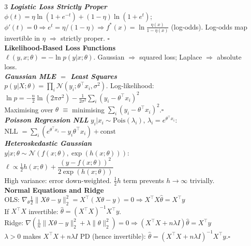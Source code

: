 \documentclass[a4paper,7pt]{article}
\begin{document}
\begin{multicols*}{3}
\textit{\textbf{Logistic Loss Strictly Proper}}\\
$\phi(t)=\eta\ln(1+e^{-t})+(1-\eta)\ln(1+e^t)$; $\phi'(t)=0\Rightarrow e^t=\eta/(1-\eta)\Rightarrow f^*(x)=\ln\frac{\eta(x)}{1-\eta(x)}$ (log-odds). Log-odds map invertible in $\eta$ $\Rightarrow$ strictly proper. \hfill$\square$\\

\textbf{Likelihood-Based Loss Functions}\\
$\ell(y,x;\theta)=-\ln p(y|x;\theta)$. Gaussian $\Rightarrow$ squared loss; Laplace $\Rightarrow$ absolute loss.\\

\textit{\textbf{Gaussian MLE $=$ Least Squares}}\\
$p(y|X;\theta)=\prod_i\mathcal{N}(y_i;\theta^\top x_i,\sigma^2)$. Log-likelihood:\\
$\ln p=-\frac{n}{2}\ln(2\pi\sigma^2)-\frac{1}{2\sigma^2}\sum_i(y_i-\theta^\top x_i)^2$\\
Maximising over $\theta$ $\equiv$ minimising $\sum_i(y_i-\theta^\top x_i)^2$.\hfill$\square$\\

\textit{\textbf{Poisson Regression NLL}} $y_i|x_i\sim\mathrm{Pois}(\lambda_i)$, $\lambda_i=e^{\theta^\top x_i}$:\\
NLL $=\sum_i(e^{\theta^\top x_i}-y_i\theta^\top x_i)+\mathrm{const}$\\

\textit{\textbf{Heteroskedastic Gaussian}}\\
$y|x;\theta\sim\mathcal{N}(f(x;\theta),\exp(h(x;\theta)))$:\\
$\ell\propto\tfrac{1}{2}h(x;\theta)+\dfrac{(y-f(x;\theta))^2}{2\exp(h(x;\theta))}$\\
High variance: error down-weighted. $\frac{1}{2}h$ term prevents $h\to\infty$ trivially.\\

\textbf{Normal Equations and Ridge}\\
OLS: $\nabla_\theta\tfrac{1}{2}\|X\theta-y\|_2^2=X^\top(X\theta-y)=0\Rightarrow X^\top X\hat\theta=X^\top y$\\
If $X^\top X$ invertible: $\hat\theta=(X^\top X)^{-1}X^\top y$.\\
Ridge: $\nabla(\tfrac{1}{n}\|X\theta-y\|_2^2+\lambda\|\theta\|_2^2)=0\Rightarrow(X^\top X+n\lambda I)\hat\theta=X^\top y$\\
$\lambda>0$ makes $X^\top X+n\lambda I$ PD (hence invertible): $\hat\theta=(X^\top X+n\lambda I)^{-1}X^\top y$.\hfill$\square$\\


\end{multicols*}
\end{document}

